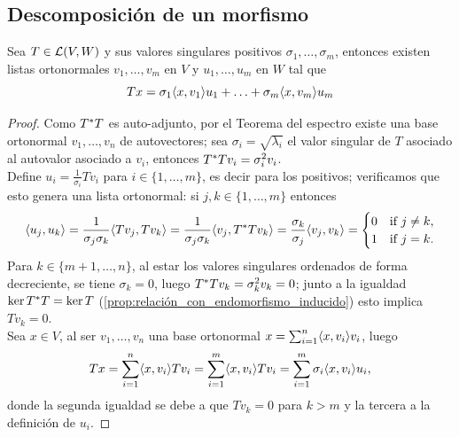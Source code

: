 \subsection{Descomposición de un morfismo}
\begin{theorem}
	Sea $T\in \mathcal{L}(V,W)$ y sus valores singulares positivos $\sigma_1,\ldots,\sigma_m$, entonces existen listas ortonormales $v_1,\ldots,v_m$ en $V$ y $u_1,\ldots,u_m$ en $W$ tal que \[
		Tx=\sigma_1\langle x,v_1\rangle u_1+\ldots+ \sigma_m\langle x,v_m\rangle u_m
	\]
\end{theorem}
\begin{proof}
	Como $T^{\ast} T$ es auto-adjunto, por el Teorema del espectro existe una base ortonormal $v_1,\ldots,v_n$ de autovectores; sea $\sigma_i=\sqrt{\lambda_i}$ el valor singular de $T$ asociado al autovalor asociado a $v_i$, entonces $T^{\ast} T v_i=\sigma_i^2 v_i$.\\
	Define $u_i=\frac{1}{\sigma_i}Tv_i$ para $i\in \{1,\ldots,m\}$, es decir para los positivos; verificamos que esto genera una lista ortonormal: si $j,k\in \{1,\ldots,m\}$ entonces \[
		\langle u_j, u_k\rangle = \frac{1}{\sigma_j \sigma_k} \langle Tv_j, Tv_k\rangle = \frac{1}{\sigma_j \sigma_k} \langle v_j, T^*Tv_k\rangle = \frac{\sigma_k}{\sigma_j} \langle v_j, v_k\rangle = \begin{cases} 0 & \text{if } j \neq k, \\ 1 & \text{if } j = k. \end{cases}
	\]
	Para $k\in\{m+1,\ldots,n\}$, al estar los valores singulares ordenados de forma decreciente, se tiene $\sigma_k=0$, luego $T^{\ast} T v_k=\sigma_k^2 v_k=0$; junto a la igualdad $\ker T^{\ast} T=\ker T$ (\cref{prop:relación_con_endomorfismo_inducido}) esto implica $Tv_k=0$.\\
	Sea $x\in V$, al ser $v_1,\ldots,v_n$ una base ortonormal $x=\sum_{i=1}^n \langle x,v_i\rangle v_i$, luego \[
		Tx= \sum_{i=1}^n \langle x,v_i\rangle Tv_i = \sum_{i=1}^m \langle x,v_i\rangle Tv_i= \sum_{i=1}^m \sigma_i\langle x,v_i\rangle u_i,
	\] donde la segunda igualdad se debe a que $Tv_k=0$ para $k>m$ y la tercera a la definición de $u_i$.
\end{proof}

